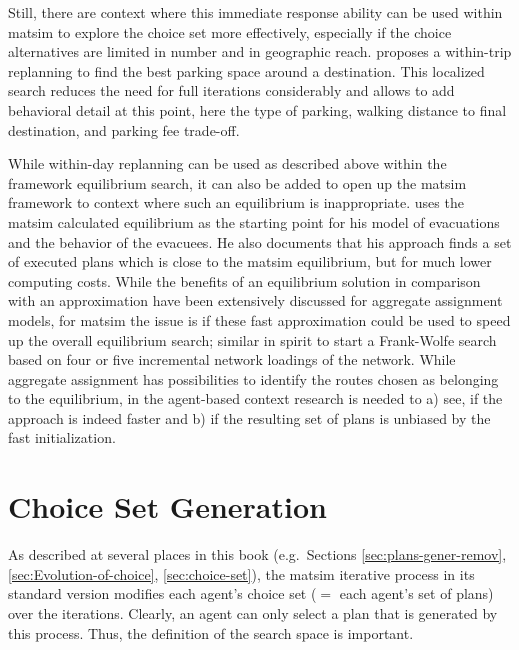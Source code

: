 Still, there are context where this immediate response ability can be used within \gls{matsim} to explore the choice set more effectively, especially if the choice alternatives are limited in number and in geographic reach. 
\citet[][]{WaraichEtAl_TechRep_IVT_2013_2}
proposes a 
within-trip replanning to find the best parking space around a destination.
This localized search reduces the need for full iterations considerably and allows to add behavioral detail at this point, here the type of parking, walking distance to final destination, and parking fee trade-off. 

While within-day replanning can be used as described above within the framework equilibrium search, it can also be added to open up the \gls{matsim} framework to context where such an equilibrium is inappropriate. 
%
\citet[][]{Dobler_PhDThesis_2013} uses the \gls{matsim} calculated equilibrium as the starting point for his model of evacuations and the behavior of the evacuees. 
He also documents that his approach finds a set of executed plans which is close to the \gls{matsim} equilibrium, but for much lower computing costs. 
While the benefits of an equilibrium solution in comparison with an approximation have been extensively discussed for aggregate assignment models, for \gls{matsim} the issue is if these fast approximation could be used to speed up the overall equilibrium search; similar in spirit to start a Frank-Wolfe search based on four or five incremental network loadings of the network.
While aggregate assignment has possibilities to identify the routes chosen as belonging to the equilibrium, in the agent-based context research is needed to a) see, if the approach is indeed faster and b) if the resulting set of plans is unbiased by the fast initialization. 

\section{Choice Set Generation}
\label{sec:choicesets}

As described at several places in this book (e.g.\ Sections
\ref{sec:plans-gener-remov}, 
\ref{sec:Evolution-of-choice},
\ref{sec:choice-set}), the \gls{matsim} iterative process in its standard version modifies each agent's choice set ($=$ each agent's set of plans) over the iterations.  
%
Clearly, an agent can only select a plan that is generated by this process.  Thus, the definition of the search space is important.


